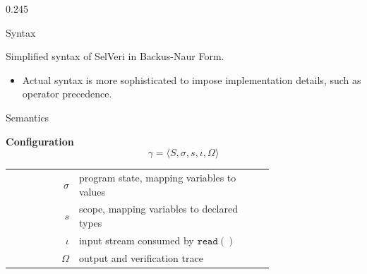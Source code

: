 \documentclass[final]{beamer}
\newcommand{\posterbodyfont}{\fontsize{24}{31}\selectfont}
\newcommand{\postercaptionfont}{\fontsize{18}{23}\selectfont}
\begin{document}
\begin{frame}[t,fragile]
\begin{columns}[t,totalwidth=\textwidth]
\begin{column}{0.245\textwidth}
\begin{posterbox}[height=16.8cm,compactboxtitle]{Syntax}
{\vspace{0.12cm}
\begin{center}
{\postercaptionfont Simplified syntax of SelVeri in Backus-Naur Form.}
\end{center}

\vspace{-0.05cm}
\begin{itemize}
  \item Actual syntax is more sophisticated to impose implementation details, such as operator precedence.
\end{itemize}
}
\end{posterbox}

\vspace{0.25cm}

\begin{posterbox}[height=26.6cm,compactboxtitle]{Semantics}
{\posterbodyfont
\begin{mathbox}[left=0.25cm,right=0.25cm,top=0.2cm,bottom=0.2cm]
\textbf{Configuration}
\[
\gamma = \langle S,\sigma,s,\iota,\Omega\rangle
\]
\vspace{-0.25cm}
\begin{center}
\renewcommand{\arraystretch}{1.08}
\begin{tabular}{>{$}r<{$}p{0.74\linewidth}}
\sigma & program state, mapping variables to values \\
s      & scope, mapping variables to declared types \\
\iota  & input stream consumed by \(\mathtt{read}()\) \\
\Omega & output and verification trace
\end{tabular}
\end{center}
\end{mathbox}

}
\end{posterbox}
\end{column}
\end{columns}
\end{frame}
\end{document}
